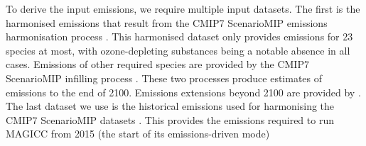 To derive the input emissions, we require multiple input datasets.
The first is the harmonised emissions that result from the CMIP7 ScenarioMIP emissions harmonisation process \citep{kikstra_scenariomip-emissions_2026}.
This harmonised dataset only provides emissions for 23 species at most, with ozone-depleting substances being a notable absence in all cases.
Emissions of other required species are provided by the CMIP7 ScenarioMIP infilling process \citep{nicholls_scenariomip-scm-projections_2026}.
These two processes produce estimates of emissions to the end of 2100.
Emissions extensions beyond 2100 are provided by \citet{sandstad_scenariomip-extensions_2026}.
The last dataset we use is the historical emissions used for harmonising the CMIP7 ScenarioMIP datasets \citep[described in][which also lists the underlying sources]{kikstra_scenariomip-emissions_2026}.
This provides the emissions required to run MAGICC from 2015 (the start of its emissions-driven mode)
